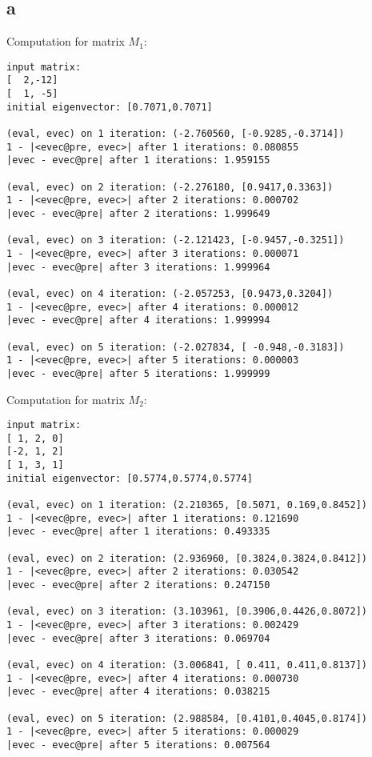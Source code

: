 \subsection*{a}
Computation for matrix $M_1$:
\begin{verbatim}
input matrix:
[  2,-12]
[  1, -5]
initial eigenvector: [0.7071,0.7071]

(eval, evec) on 1 iteration: (-2.760560, [-0.9285,-0.3714])
1 - |<evec@pre, evec>| after 1 iterations: 0.080855
|evec - evec@pre| after 1 iterations: 1.959155

(eval, evec) on 2 iteration: (-2.276180, [0.9417,0.3363])
1 - |<evec@pre, evec>| after 2 iterations: 0.000702
|evec - evec@pre| after 2 iterations: 1.999649

(eval, evec) on 3 iteration: (-2.121423, [-0.9457,-0.3251])
1 - |<evec@pre, evec>| after 3 iterations: 0.000071
|evec - evec@pre| after 3 iterations: 1.999964

(eval, evec) on 4 iteration: (-2.057253, [0.9473,0.3204])
1 - |<evec@pre, evec>| after 4 iterations: 0.000012
|evec - evec@pre| after 4 iterations: 1.999994

(eval, evec) on 5 iteration: (-2.027834, [ -0.948,-0.3183])
1 - |<evec@pre, evec>| after 5 iterations: 0.000003
|evec - evec@pre| after 5 iterations: 1.999999
\end{verbatim}
Computation for matrix $M_2$:
\begin{verbatim}
input matrix:
[ 1, 2, 0]
[-2, 1, 2]
[ 1, 3, 1]
initial eigenvector: [0.5774,0.5774,0.5774]

(eval, evec) on 1 iteration: (2.210365, [0.5071, 0.169,0.8452])
1 - |<evec@pre, evec>| after 1 iterations: 0.121690
|evec - evec@pre| after 1 iterations: 0.493335

(eval, evec) on 2 iteration: (2.936960, [0.3824,0.3824,0.8412])
1 - |<evec@pre, evec>| after 2 iterations: 0.030542
|evec - evec@pre| after 2 iterations: 0.247150

(eval, evec) on 3 iteration: (3.103961, [0.3906,0.4426,0.8072])
1 - |<evec@pre, evec>| after 3 iterations: 0.002429
|evec - evec@pre| after 3 iterations: 0.069704

(eval, evec) on 4 iteration: (3.006841, [ 0.411, 0.411,0.8137])
1 - |<evec@pre, evec>| after 4 iterations: 0.000730
|evec - evec@pre| after 4 iterations: 0.038215

(eval, evec) on 5 iteration: (2.988584, [0.4101,0.4045,0.8174])
1 - |<evec@pre, evec>| after 5 iterations: 0.000029
|evec - evec@pre| after 5 iterations: 0.007564
\end{verbatim}

